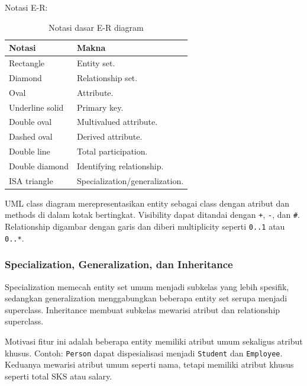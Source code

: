 Notasi E-R:
\begin{table}[H]
\centering
\begin{tabularx}{\textwidth}{|L{0.24\textwidth}|X|}
\hline
\textbf{Notasi} & \textbf{Makna} \\
\hline
Rectangle & Entity set. \\
\hline
Diamond & Relationship set. \\
\hline
Oval & Attribute. \\
\hline
Underline solid & Primary key. \\
\hline
Double oval & Multivalued attribute. \\
\hline
Dashed oval & Derived attribute. \\
\hline
Double line & Total participation. \\
\hline
Double diamond & Identifying relationship. \\
\hline
ISA triangle & Specialization/generalization. \\
\hline
\end{tabularx}
\caption{Notasi dasar E-R diagram}
\label{tab:er-notation}
\end{table}

UML class diagram merepresentasikan entity sebagai class dengan atribut dan methods di dalam kotak bertingkat. Visibility dapat ditandai dengan \texttt{+}, \texttt{-}, dan \texttt{\#}. Relationship digambar dengan garis dan diberi multiplicity seperti \texttt{0..1} atau \texttt{0..*}.

\subsubsection{Specialization, Generalization, dan Inheritance}

\begin{jawab}
Specialization memecah entity set umum menjadi subkelas yang lebih spesifik, sedangkan generalization menggabungkan beberapa entity set serupa menjadi superclass. Inheritance membuat subkelas mewarisi atribut dan relationship superclass.
\end{jawab}

Motivasi fitur ini adalah beberapa entity memiliki atribut umum sekaligus atribut khusus. Contoh: \texttt{Person} dapat dispesialisasi menjadi \texttt{Student} dan \texttt{Employee}. Keduanya mewarisi atribut umum seperti nama, tetapi memiliki atribut khusus seperti total SKS atau salary.

